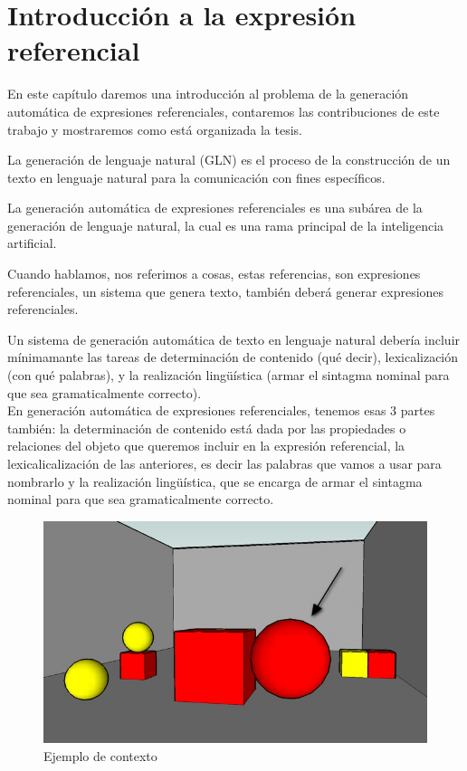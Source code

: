 \chapter{Introducci\'on a la expresi\'on referencial}
\label{sec:intro}

En este cap\'itulo daremos una introducci\'on al problema de la generaci\'on autom\'atica de expresiones referenciales, contaremos las contribuciones de este trabajo y mostraremos como est\'a organizada la tesis.


La generaci\'on de lenguaje natural (GLN) es el proceso de la construcci\'on de un texto en lenguaje natural para la comunicaci\'on con fines espec\'ificos. 

La generaci\'on autom\'atica de expresiones referenciales es una sub\'area de la generaci\'on de lenguaje natural, la cual es una rama principal de la inteligencia artificial.

Cuando hablamos, nos referimos a cosas, estas referencias, son expresiones referenciales, un sistema que genera texto, tambi\'en deber\'a generar expresiones referenciales.


Un sistema de generaci\'on autom\'atica de texto en lenguaje natural deber\'ia incluir m\'inimamante 
las tareas de determinaci\'on de contenido (qu\'e decir), lexicalizaci\'on (con qu\'e palabras), y la realizaci\'on ling\"{u}\'istica (armar el  sintagma nominal para que sea gramaticalmente correcto). \\
En generaci\'on autom\'atica de expresiones referenciales, tenemos esas 3 partes tambi\'en: la determinaci\'on de contenido est\'a dada por las propiedades o relaciones del objeto que queremos incluir en la expresi\'on referencial, la lexicalicalizaci\'on de las anteriores, es decir las palabras que vamos a usar para nombrarlo y la realizaci\'on ling\"u\'istica, que se encarga de armar el sintagma nominal para que sea gramaticalmente correcto.\\

 
\begin{figure}[ht]
\centering
\includegraphics[scale=.4]{images/22sinletras.jpg}
\caption{Ejemplo de contexto}
\label{GRE3D7-stimulus1}

\end{figure}

